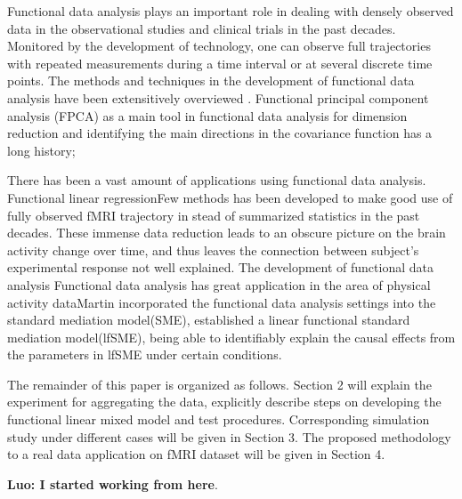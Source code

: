 \documentclass[12pt]{article}
\def\luo#1{{\bf \color{red} Luo: \color{blue} #1}}
\begin{document}
Functional data analysis plays an important role in dealing with densely observed data in the observational studies and clinical trials in the past decades\cite{goldsmith2015generalized,di2009multilevel,ramsay2006functional,ramsay2007applied,xiao2018fast,xiao2016fast, yao2005functional, mclean2015restricted, huang2014joint, xiao2014quantifying}. Monitored by the development of technology, one can observe full trajectories with repeated measurements during a time interval or at several discrete time points\cite{crainiceanu2009generalized, xiao2014quantifying, goldsmith2015generalized,xiao2016movement}. The methods and techniques in the development of functional data analysis have been extensitively overviewed \cite{ramsay2005functional, ramsay2007applied, wang2016functional}. Functional principal component analysis (FPCA) as a main tool in functional data analysis for dimension reduction and identifying the main directions in the covariance function has a long history\cite{ramsay1991some,kneip1994nonparametric, staniswalis1998nonparametric, yao2005functional, di2009multilevel,zipunnikov2011multilevel};




There has been a vast amount of applications using functional data analysis. Functional linear regressionFew methods has been developed to make good use of fully observed fMRI trajectory in stead of summarized statistics in the past decades\cite{cohen2017computational, lindquist2012functional}. These immense data reduction leads to an obscure picture on the brain activity change over time, and thus leaves the connection between subject's experimental response not well explained. The development of functional data analysis  Functional data analysis has great application in the area of physical activity dataMartin\cite{lindquist2012functional} incorporated the functional data analysis settings into the standard mediation model(SME), established a linear functional standard mediation model(lfSME), being able to identifiably explain the causal effects from the parameters in lfSME under certain conditions.

The remainder of this paper is organized as follows. Section 2 will explain the experiment for aggregating the data, explicitly describe steps on developing the functional linear mixed model and test procedures. Corresponding simulation study under different cases will be given in Section 3. The proposed methodology to a real data application on fMRI dataset will be given in Section 4. 

\luo{I started working from here}.


\newpage

\newpage


%
\end{document}
